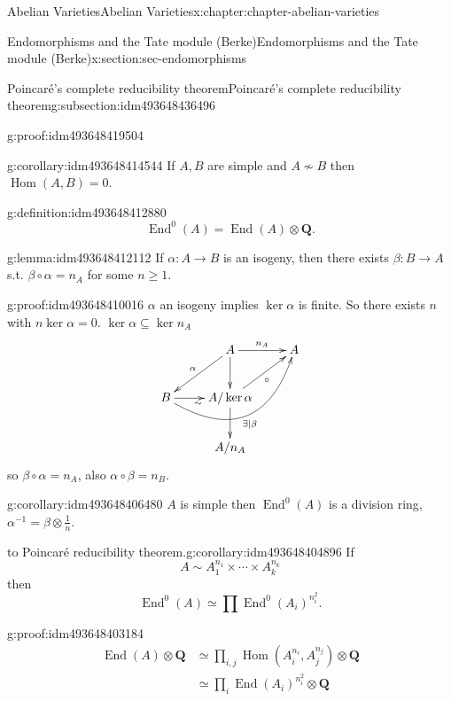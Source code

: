 \documentclass[oneside,10pt,]{book}
\numberwithin{equation}{section}
\newcommand{\QQ}{\mathbf{Q}}
\DeclareMathOperator{\End}{End}
\DeclareMathOperator{\Hom}{Hom}
\newcommand{\amp}{&}
\begin{document}
\begin{chapterptx}{Abelian Varieties}{}{Abelian Varieties}{}{}{x:chapter:chapter-abelian-varieties}
\begin{sectionptx}{Endomorphisms and the Tate module (Berke)}{}{Endomorphisms and the Tate module (Berke)}{}{}{x:section:sec-endomorphisms}
\begin{subsectionptx}{Poincaré's complete reducibility theorem}{}{Poincaré's complete reducibility theorem}{}{}{g:subsection:idm493648436496}
\begin{proofptx}{}{g:proof:idm493648419504}
\end{proofptx}
\begin{corollary}{}{}{g:corollary:idm493648414544}%
If \(A,B\) are simple and  \(A\not\sim B\) then \(\Hom(A,B) = 0\).%
\end{corollary}
\begin{definition}{}{g:definition:idm493648412880}%
%
\begin{equation*}
\End^0(A) = \End(A) \otimes \QQ\text{.}
\end{equation*}
%
\end{definition}
\begin{lemma}{}{}{g:lemma:idm493648412112}%
If \(\alpha \colon A\to B\) is an isogeny, then there exists \(\beta \colon B\to A\) s.t. \(\beta \circ \alpha = n_A\) for some \(n \ge 1\).%
\end{lemma}
\begin{proofptx}{}{g:proof:idm493648410016}
\(\alpha\) an isogeny implies \(\ker \alpha\) is finite. So there exists \(n\) with \(n \ker \alpha = 0\). \(\ker\alpha \subseteq \ker n_A\)%
\begin{equation*}
\xymatrix{
& A \ar[dl]_\alpha \ar[d]\ar[r]^{n_A} & A \\
B\ar[r]_\sim \ar@/_3.0pc/[urr]_{\exists | \beta} & A/\ker\alpha \ar[d]\ar[ur]_{\circ} &\\
& A/n_A &
}
\end{equation*}
so \(\beta\circ \alpha = n_A\), also \(\alpha \circ \beta = n_B\).%
\end{proofptx}
\begin{corollary}{}{}{g:corollary:idm493648406480}%
\(A\) is simple then \(\End^0(A)\) is a division ring, \(\alpha^{-1} = \beta \otimes \frac 1n\).%
\end{corollary}
\begin{corollary}{to Poincaré reducibility theorem.}{}{g:corollary:idm493648404896}%
If%
\begin{equation*}
A\sim A_1^{n_1} \times \cdots \times A_k^{n_k}
\end{equation*}
then%
\begin{equation*}
\End^0(A) \simeq \prod \End^0(A_i)^{n_i^2}\text{.}
\end{equation*}
%
\end{corollary}
\begin{proofptx}{}{g:proof:idm493648403184}
%
\begin{align*}
\End(A) \otimes \QQ \amp \simeq \prod_{i,j} \Hom(A_i^{n_i}, A_j^{n_j}) \otimes \QQ\\
\amp \simeq \prod_{i} \End(A_i)^{n_i^2} \otimes \QQ\\

\end{align*}
\end{proofptx}
\end{subsectionptx}
\end{sectionptx}
\end{chapterptx}
\end{document}
